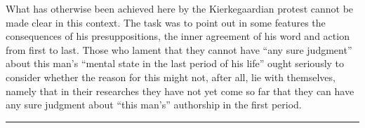 \documentclass[12pt,a4paper]{article}
\begin{document}
What has otherwise been achieved here by the Kierkegaardian
protest cannot be made clear in this context.
The task was to point out in some features the consequences
of his presuppositions, the inner agreement
of his word and action from first to last. Those
who lament that they cannot have ``any sure judgment''
about this man's ``mental state in the last period
of his life'' ought seriously to consider whether the reason for this
might not, after all, lie with themselves, namely that
in their researches they have not yet come so far
that they can have any sure judgment about ``this man's''
authorship in the first period.

\begin{center}\rule{0.25\linewidth}{0.4pt}\end{center}
\end{document}
